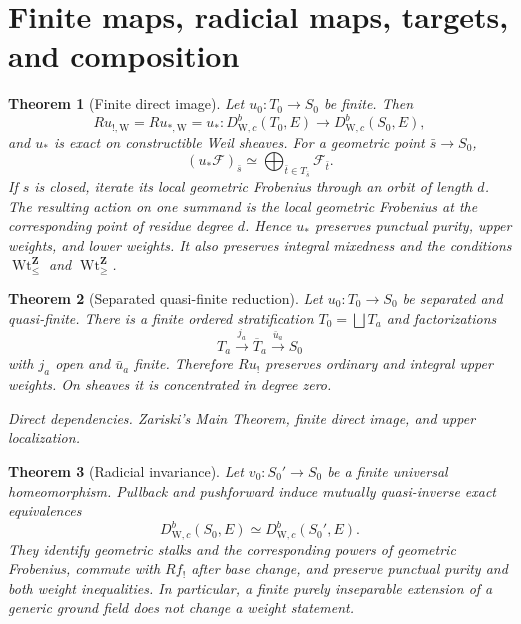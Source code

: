 \documentclass[10pt]{article}
\newtheorem{theorem}{Theorem}[section]
\theoremstyle{definition}
\newcommand{\DW}{D^b_{\mathrm W,c}}
\newcommand{\IntWtLe}{\operatorname{Wt}^{\mathbf Z}_{\leq}}
\newcommand{\IntWtGe}{\operatorname{Wt}^{\mathbf Z}_{\geq}}
\newcommand{\dep}[1]{\par\smallskip\noindent\textit{Direct dependencies.} #1\par}
\begin{document}
\section{Finite maps, radicial maps, targets, and composition}

\begin{theorem}[Finite direct image]
Let \(u_0:T_0\to S_0\) be finite.  Then
\[
 Ru_{!,\mathrm W}=Ru_{*,\mathrm W}=u_*:
 \DW(T_0,E)\longrightarrow\DW(S_0,E),
\]
and \(u_*\) is exact on constructible Weil sheaves.  For a geometric point
\(\bar s\to S_0\),
\[
             (u_*\mathcal F)_{\bar s}
       \simeq\bigoplus_{\bar t\in T_{\bar s}}\mathcal F_{\bar t}.
\]
If \(s\) is closed, iterate its local geometric Frobenius through an orbit
of length \(d\).  The resulting action on one summand is the local
geometric Frobenius at the corresponding point of residue degree \(d\).
Hence \(u_*\) preserves punctual purity, upper weights, and lower weights.
It also preserves integral mixedness and the conditions \(\IntWtLe\) and
\(\IntWtGe\).
\end{theorem}

\begin{theorem}[Separated quasi-finite reduction]
Let \(u_0:T_0\to S_0\) be separated and quasi-finite.  There is a finite
ordered stratification \(T_0=\bigsqcup T_a\) and factorizations
\[
        T_a\xrightarrow{j_a}\overline T_a\xrightarrow{\bar u_a}S_0
\]
with \(j_a\) open and \(\bar u_a\) finite.  Therefore \(Ru_!\) preserves
ordinary and integral upper weights.  On sheaves it is concentrated in
degree zero.
\dep{Zariski's Main Theorem, finite direct image, and upper localization.}
\end{theorem}

\begin{theorem}[Radicial invariance]
Let \(v_0:S_0'\to S_0\) be a finite universal homeomorphism.  Pullback and
pushforward induce mutually quasi-inverse exact equivalences
\[
 \DW(S_0,E)\simeq\DW(S_0',E).
\]
They identify geometric stalks and the corresponding powers of geometric
Frobenius, commute with \(Rf_!\) after base change, and preserve punctual
purity and both weight inequalities.  In particular, a finite purely
inseparable extension of a generic ground field does not change a weight
statement.
\end{theorem}
\end{document}
